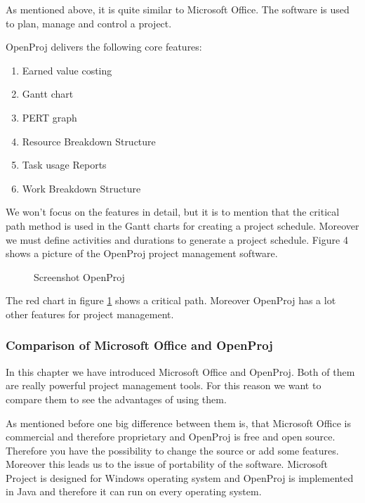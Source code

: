 As mentioned above, it is quite similar to Microsoft Office. The software is used to plan, manage and control a project.

OpenProj delivers the following core features:
\begin{enumerate}
\item Earned value costing
\item Gantt chart
\item PERT graph
\item Resource Breakdown Structure
\item Task usage Reports
\item Work Breakdown Structure
\end{enumerate}

We won't focus on the features in detail, but it is to mention that the critical path method is used in the Gantt charts for creating a project schedule. Moreover we must define activities and durations to generate a project schedule. Figure 4 shows a picture of the OpenProj project management software.

\begin{figure}[h!!] 
\centerline{}
\caption{Screenshot OpenProj}
\label{pic:openproj}
\end{figure}

The red chart in figure \ref{pic:openproj} shows a critical path. Moreover OpenProj has a lot other features for project management.
\subsubsection{Comparison of Microsoft Office and OpenProj}
In this chapter we have introduced Microsoft Office and OpenProj. Both of them are really powerful project management tools. For this reason we want to compare them to see the advantages of using them.

As mentioned before one big difference between them is, that Microsoft Office is commercial and therefore proprietary and OpenProj is free and open source. Therefore you have the possibility to change the source or add some features.
Moreover this leads us to the issue of  portability of the software. Microsoft Project is designed for Windows operating system and OpenProj is implemented in Java and therefore it can run on every operating system.

